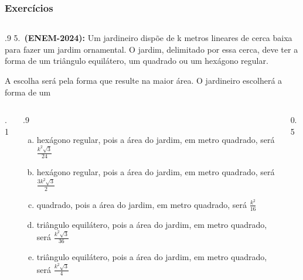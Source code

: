 \documentclass[aspectratio=169, t, 8pt]{beamer}
\begin{document}
    \begin{frame} %
        \frametitle{Exercícios}
        \begin{columns}
            \begin{column}{.9\textwidth}
                5.~\textbf{(ENEM-2024): }Um jardineiro dispõe de k metros lineares de cerca baixa para fazer um jardim ornamental. O jardim, delimitado por essa cerca, deve ter a forma de um triângulo equilátero, um quadrado ou um hexágono regular.
                
                A escolha será pela forma que resulte na maior área. O jardineiro escolherá a forma de um 

                \begin{columns}
                    \begin{column}{.1\textwidth}
                        
                    \end{column}
                    \begin{column}{.9\textwidth}
                         
                        \begin{enumerate}[a.]
                            \item hexágono regular, pois a área do jardim, em metro quadrado, será $\displaystyle \frac{k^2 \sqrt{3}}{24} $
                            \item hexágono regular, pois a área do jardim, em metro quadrado, será $\displaystyle \frac{3k^2\sqrt{3}}{2}$
                            \item quadrado, pois a área do jardim, em metro quadrado, será $\displaystyle \frac{k^2}{16}$
                            \item triângulo equilátero, pois a área do jardim, em metro quadrado, será $\displaystyle \frac{k^2 \sqrt{3}}{36}$
                            \item triângulo equilátero, pois a área do jardim, em metro quadrado, será $\displaystyle \frac{k^2 \sqrt{3}}{4}$
                        \end{enumerate}
                    \end{column}
                    \begin{column}{0.5\textwidth}
                        
                    \end{column}
                \end{columns}
            \end{column}
        \end{columns}
    \end{frame}
    
\end{document}
